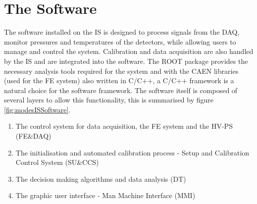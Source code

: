 \section{The Software}
The software installed on the IS is designed to process signals from the DAQ, monitor pressures and temperatures of the detectors, while allowing users to manage and control the system. Calibration and data acquisition are also handled by the IS and are integrated into the software. The ROOT package provides the necessary analysis tools required for the system and with the CAEN libraries (used for the FE system) also written in C/C++, a C/C++ framework is a natural choice for the software framework. The software itself is composed of several layers to allow this functionality, this is summarised by figure \ref{fig:modesISSoftware}.

\begin{enumerate}
	\item The control system for data acquisition, the FE system and the HV-PS (FE\&DAQ)
	\item The initialisation and automated calibration process - Setup and Calibration Control System (SU\&CCS)
	\item The decision making algorithms and data analysis (DT)
	\item The graphic user interface - Man Machine Interface (MMI)
\end{enumerate}

